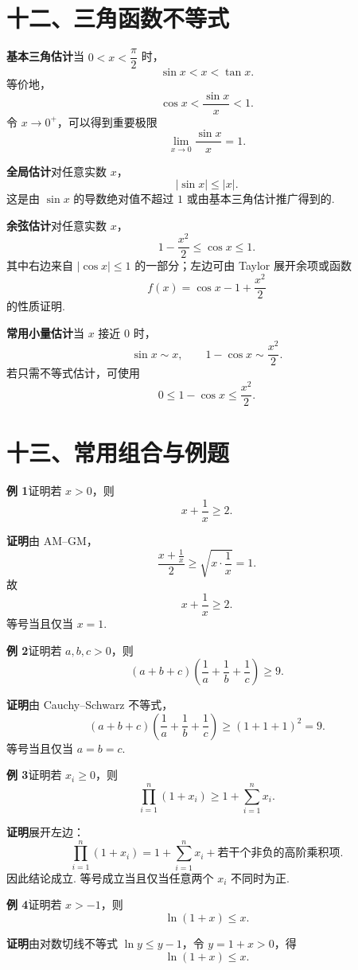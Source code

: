 \documentclass[UTF8,12pt,a4paper,fontset=fandol]{ctexart}
\begin{document}
\section*{十二、三角函数不等式}

\noindent\textbf{基本三角估计}\quad 当 $0<x<\dfrac{\pi}{2}$ 时，
\[
  \sin x<x<\tan x.
\]
等价地，
\[
  \cos x<\frac{\sin x}{x}<1.
\]
令 $x\to0^+$，可以得到重要极限
\[
  \lim_{x\to0}\frac{\sin x}{x}=1.
\]

\noindent\textbf{全局估计}\quad 对任意实数 $x$，
\[
  |\sin x|\le |x|.
\]
这是由 $\sin x$ 的导数绝对值不超过 $1$ 或由基本三角估计推广得到的.

\noindent\textbf{余弦估计}\quad 对任意实数 $x$，
\[
  1-\frac{x^2}{2}\le \cos x\le1.
\]
其中右边来自 $|\cos x|\le1$ 的一部分；左边可由 Taylor 展开余项或函数
\[
  f(x)=\cos x-1+\frac{x^2}{2}
\]
的性质证明.

\noindent\textbf{常用小量估计}\quad 当 $x$ 接近 $0$ 时，
\[
  \sin x\sim x,\qquad 1-\cos x\sim \frac{x^2}{2}.
\]
若只需不等式估计，可使用
\[
  0\le1-\cos x\le\frac{x^2}{2}.
\]

\section*{十三、常用组合与例题}

\noindent\textbf{例 1}\quad 证明若 $x>0$，则
\[
  x+\frac1x\ge2.
\]

\noindent\textbf{证明}\quad 由 AM--GM，
\[
  \frac{x+\frac1x}{2}\ge \sqrt{x\cdot\frac1x}=1.
\]
故
\[
  x+\frac1x\ge2.
\]
等号当且仅当 $x=1$.

\noindent\textbf{例 2}\quad 证明若 $a,b,c>0$，则
\[
  (a+b+c)\left(\frac1a+\frac1b+\frac1c\right)\ge9.
\]

\noindent\textbf{证明}\quad 由 Cauchy--Schwarz 不等式，
\[
  (a+b+c)\left(\frac1a+\frac1b+\frac1c\right)
  \ge
  (1+1+1)^2=9.
\]
等号当且仅当 $a=b=c$.

\noindent\textbf{例 3}\quad 证明若 $x_i\ge0$，则
\[
  \prod_{i=1}^n (1+x_i)
  \ge
  1+\sum_{i=1}^n x_i.
\]

\noindent\textbf{证明}\quad 展开左边：
\[
  \prod_{i=1}^n(1+x_i)
  =
  1+\sum_{i=1}^n x_i+\text{若干个非负的高阶乘积项}.
\]
因此结论成立. 等号成立当且仅当任意两个 $x_i$ 不同时为正.

\noindent\textbf{例 4}\quad 证明若 $x>-1$，则
\[
  \ln(1+x)\le x.
\]

\noindent\textbf{证明}\quad 由对数切线不等式 $\ln y\le y-1$，令 $y=1+x>0$，得
\[
  \ln(1+x)\le x.
\]
\end{document}
